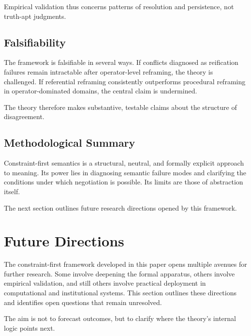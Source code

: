 \documentclass[11pt]{article}
\begin{document}
Empirical validation thus concerns patterns of resolution and persistence, not
truth-apt judgments.

\subsection{Falsifiability}

The framework is falsifiable in several ways. If conflicts diagnosed as
reification failures remain intractable after operator-level reframing, the
theory is challenged. If referential reframing consistently outperforms
procedural reframing in operator-dominated domains, the central claim is
undermined.

The theory therefore makes substantive, testable claims about the structure of
disagreement.

\subsection{Methodological Summary}

Constraint-first semantics is a structural, neutral, and formally explicit
approach to meaning. Its power lies in diagnosing semantic failure modes and
clarifying the conditions under which negotiation is possible. Its limits are
those of abstraction itself.

The next section outlines future research directions opened by this framework.

\section{Future Directions}

The constraint-first framework developed in this paper opens multiple avenues for
further research. Some involve deepening the formal apparatus, others involve
empirical validation, and still others involve practical deployment in
computational and institutional systems. This section outlines these directions
and identifies open questions that remain unresolved.

The aim is not to forecast outcomes, but to clarify where the theory’s internal
logic points next.
\end{document}
